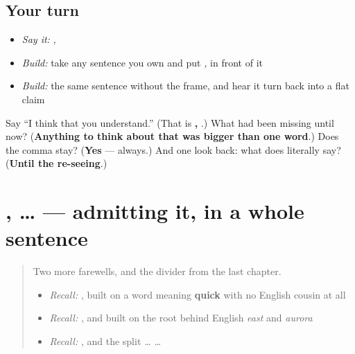 \subsection*{Your turn}
\begin{itemize}
\raggedright
  \item \emph{Say it:} \emph{ ,   }
  \item \emph{Build:} take any sentence you own and put \emph{ , } in front of it
  \item \emph{Build:} the same sentence without the frame, and hear it turn back into a flat claim
\end{itemize}

\begin{tcolorbox}[breakable,colback=teal!4,colframe=teal!35!black,title={Before you move on}]
Say \textquotedblleft{}I think that you understand.\textquotedblright{} (That is \textbf{ ,   }.) What had \emph{} been missing until now? (\textbf{Anything to think about that was bigger than one word}.) Does the comma stay? (\textbf{Yes} — always.) And one look back: what does \emph{ } literally say? (\textbf{Until the re-seeing}.)
\end{tcolorbox}
\section[\texorpdfstring{\ru{я} \ru{не} \ru{знаю}, \ru{что} … (ya ne znáyu, shto …)}{я не знаю, что … (ya ne znáyu, shto …)}]{  ,  … — admitting it, in a whole sentence}

\label{lesson:RU-C18-znayu-chto}



\begin{quote}
Two more farewells, and the divider from the last chapter.

\begin{itemize}
\raggedright
  \item \emph{Recall:} \emph{ }, built on a word meaning \textbf{quick} with no English cousin at all
  \item \emph{Recall:} \emph{ }, and \emph{} built on the root behind English \emph{east} and \emph{aurora}
  \item \emph{Recall:} \emph{}, and the split \emph{ …  …}
\end{itemize}
\end{quote}

